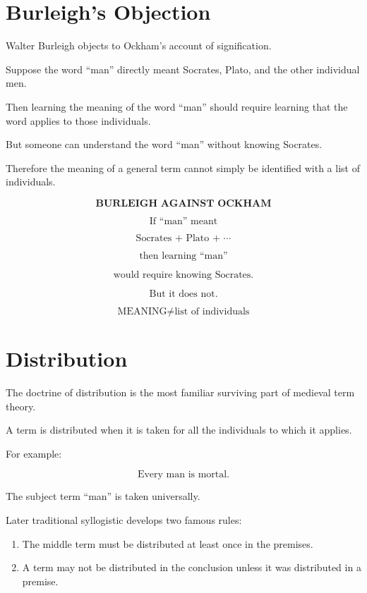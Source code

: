 \documentclass[11pt]{article}
\begin{document}
\section{Burleigh's Objection}

Walter Burleigh objects to Ockham's account of signification.

Suppose the word ``man'' directly meant Socrates, Plato, and the
other individual men.

Then learning the meaning of the word ``man'' should require
learning that the word applies to those individuals.

But someone can understand the word ``man'' without knowing
Socrates.

Therefore the meaning of a general term cannot simply be
identified with a list of individuals.

\begin{whiteboard}
\[
\textbf{BURLEIGH AGAINST OCKHAM}
\]

\[
\text{If ``man'' meant}
\]

\[
\text{Socrates + Plato + }\cdots
\]

\[
\text{then learning ``man''}
\]

\[
\text{would require knowing Socrates.}
\]

\[
\text{But it does not.}
\]

\[
\boxed{\text{MEANING} \neq \text{list of individuals}}
\]
\end{whiteboard}

\section{Distribution}

The doctrine of distribution is the most familiar surviving part
of medieval term theory.

A term is distributed when it is taken for all the individuals to
which it applies.

For example:

\[
\text{Every man is mortal.}
\]

The subject term ``man'' is taken universally.

Later traditional syllogistic develops two famous rules:

\begin{enumerate}
    \item The middle term must be distributed at least once in the premises.
    \item A term may not be distributed in the conclusion unless it was distributed in a premise.
\end{enumerate}
\end{document}
